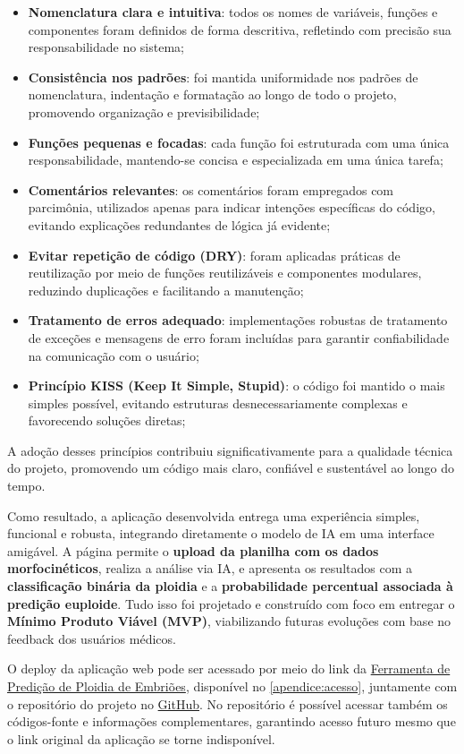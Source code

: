 \begin{itemize}
    \item \textbf{Nomenclatura clara e intuitiva}: todos os nomes de variáveis, funções e componentes foram definidos de forma descritiva, refletindo com precisão sua responsabilidade no sistema;

    \item \textbf{Consistência nos padrões}: foi mantida uniformidade nos padrões de nomenclatura, indentação e formatação ao longo de todo o projeto, promovendo organização e previsibilidade;

    \item \textbf{Funções pequenas e focadas}: cada função foi estruturada com uma única responsabilidade, mantendo-se concisa e especializada em uma única tarefa;

    \item \textbf{Comentários relevantes}: os comentários foram empregados com parcimônia, utilizados apenas para indicar intenções específicas do código, evitando explicações redundantes de lógica já evidente;

    \item \textbf{Evitar repetição de código (DRY)}: foram aplicadas práticas de reutilização por meio de funções reutilizáveis e componentes modulares, reduzindo duplicações e facilitando a manutenção;

    \item \textbf{Tratamento de erros adequado}: implementações robustas de tratamento de exceções e mensagens de erro foram incluídas para garantir confiabilidade na comunicação com o usuário;

    \item \textbf{Princípio KISS (Keep It Simple, Stupid)}: o código foi mantido o mais simples possível, evitando estruturas desnecessariamente complexas e favorecendo soluções diretas;
\end{itemize}

A adoção desses princípios contribuiu significativamente para a qualidade técnica do projeto, promovendo um código mais claro, confiável e sustentável ao longo do tempo.

Como resultado, a aplicação desenvolvida entrega uma experiência simples, funcional e robusta, integrando diretamente o modelo de IA em uma interface amigável. A página permite o \textbf{upload da planilha com os dados morfocinéticos}, realiza a análise via IA, e apresenta os resultados com a \textbf{classificação binária da ploidia} e a \textbf{probabilidade percentual associada à predição euploide}. Tudo isso foi projetado e construído com foco em entregar o \textbf{Mínimo Produto Viável (MVP)}, viabilizando futuras evoluções com base no feedback dos usuários médicos.

O deploy da aplicação web pode ser acessado por meio do link da \href{https://embryo-predictor.vercel.app}{Ferramenta de Predição de Ploidia de Embriões}, disponível no \autoref{apendice:acesso}, juntamente com o repositório do projeto no \href{https://github.com/CedisUnB/embryo-predictor}{GitHub}. No repositório é possível acessar também os códigos-fonte e informações complementares, garantindo acesso futuro mesmo que o link original da aplicação se torne indisponível.